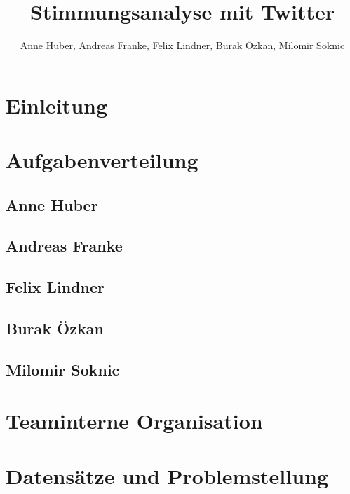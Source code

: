 \documentclass[researchlab,group,]{AIGpaper}
\author{Anne Huber, Andreas Franke, Felix Lindner, Burak Özkan, Milomir Soknic}
\title{Stimmungsanalyse mit Twitter}
\begin{document}
\maketitle %


\newpage
\section{Einleitung}

\section{Aufgabenverteilung}

\subsection{Anne Huber}
\subsection{Andreas Franke}
\subsection{Felix Lindner}
\subsection{Burak Özkan}
\subsection{Milomir Soknic}

\section{Teaminterne Organisation}

\section{Datensätze und Problemstellung}
\end{document}
